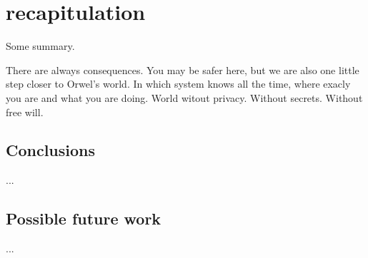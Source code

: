 \section{recapitulation}
    Some summary.

    There are always consequences.
    You may be safer here, but
    we are also one little step closer to Orwel's world.
    In which system knows all the time,
    where exacly you are and what you are doing.
    World witout privacy.
    Without secrets. Without free will.

    \subsection{Conclusions}
        ...


    \subsection{Possible future work}
        ...
